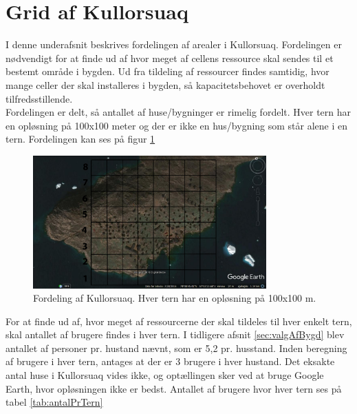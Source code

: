 \section{Grid af Kullorsuaq}
I denne underafsnit beskrives fordelingen af arealer i Kullorsuaq. Fordelingen er nødvendigt for at finde ud af hvor meget af cellens ressource skal sendes til et bestemt område i bygden. Ud fra tildeling af ressourcer findes samtidig, hvor mange celler der skal installeres i bygden, så kapacitetsbehovet er overholdt tilfredsstillende.\\

Fordelingen er delt, så antallet af huse/bygninger er rimelig fordelt. Hver tern har en opløsning på 100x100 meter og der er ikke en hus/bygning som står alene i en tern. Fordelingen kan ses på figur \ref{fig:grid}

\begin{figure}[h]
	\centering
	\includegraphics[width=0.8\textwidth]{figure/kullorsuaqGrid.pdf}
	\caption{Fordeling af Kullorsuaq. Hver tern har en opløsning på 100x100 m.}
	\label{fig:grid}
\end{figure} 

For at finde ud af, hvor meget af ressourcerne der skal tildeles til hver enkelt tern, skal antallet af brugere findes i hver tern. I tidligere afsnit \ref{sec:valgAfBygd} blev antallet af personer pr. hustand nævnt, som er 5,2 pr. husstand. Inden beregning af brugere i hver tern, antages at der er 3 brugere i hver hustand. Det eksakte antal huse i Kullorsuaq vides ikke, og optællingen sker ved at bruge Google Earth, hvor opløsningen ikke er bedst. Antallet af brugere hvor hver tern ses på tabel \ref{tab:antalPrTern}

